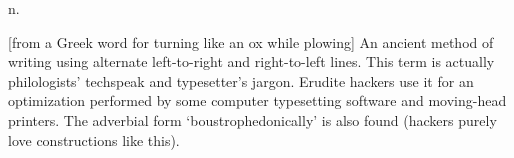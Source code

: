  n.

[from a Greek word for turning like an ox while plowing] An ancient method of
writing using alternate left-to-right and right-to-left lines. This term is
actually philologists' techspeak and typesetter's jargon. Erudite hackers use it
for an optimization performed by some computer typesetting software and
moving-head printers. The adverbial form `boustrophedonically' is also found
(hackers purely love constructions like this).

